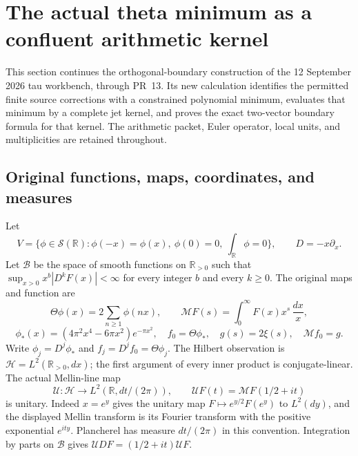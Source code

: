 \section{The actual theta minimum as a confluent arithmetic kernel}
\label{sec:tau-boundary-kernel}

This section continues the orthogonal-boundary construction of the
12 September 2026 tau workbench, through PR~13.  Its new calculation
identifies the permitted finite source corrections with a constrained
polynomial minimum, evaluates that minimum by a complete jet kernel,
and proves the exact two-vector boundary formula for that kernel.
The arithmetic packet, Euler operator, local units, and multiplicities
are retained throughout.

\subsection{Original functions, maps, coordinates, and measures}

Let
\[
 V=\{\phi\in\mathcal S(\mathbb R):
       \phi(-x)=\phi(x),\ \phi(0)=0,\ \textstyle\int_{\mathbb R}\phi=0\},
 \qquad D=-x\partial_x.
\]
Let \(\mathscr B\) be the space of smooth functions on \(\mathbb R_{>0}\)
such that
\(\sup_{x>0}x^b|D^kF(x)|<\infty\) for every integer \(b\) and
every \(k\geq0\).  The original maps and function are
\[
 \Theta\phi(x)=2\sum_{n\geq1}\phi(nx),\qquad
 \mathcal MF(s)=\int_0^\infty F(x)x^s\,\frac{dx}{x},
\]
\[
 \phi_*(x)=(4\pi^2x^4-6\pi x^2)e^{-\pi x^2},
 \quad f_0=\Theta\phi_*,
 \quad g(s)=2\xi(s),\quad \mathcal Mf_0=g.
\]
Write \(\phi_j=D^j\phi_*\) and \(f_j=D^jf_0=\Theta\phi_j\).
The Hilbert observation is \(\mathcal H=L^2(\mathbb R_{>0},dx)\);
the first argument of every inner product is conjugate-linear.
The actual Mellin-line map
\[
 \mathcal U:\mathcal H\longrightarrow
 L^2(\mathbb R,dt/(2\pi)),\qquad
 \mathcal UF(t)=\mathcal MF(1/2+it)
\]
is unitary.  Indeed \(x=e^y\) gives the unitary map
\(F\mapsto e^{y/2}F(e^y)\) to \(L^2(dy)\), and the displayed Mellin
transform is its Fourier transform with the positive exponential
\(e^{ity}\).  Plancherel has measure \(dt/(2\pi)\) in this convention.
Integration by parts on \(\mathscr B\) gives
\(\mathcal UDF=(1/2+it)\mathcal UF\).


